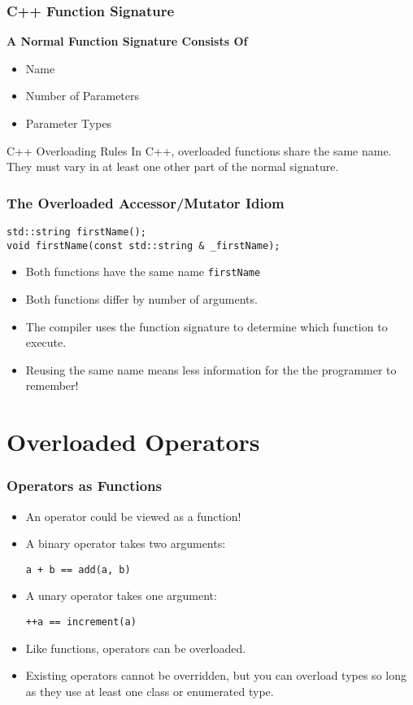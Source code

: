 \documentclass{beamer}
\begin{document}
\begin{frame}
    \frametitle{C++ Function Signature}
    {\bf A Normal Function Signature Consists Of}
    \begin{itemize}
        \item<2-> Name
        \item<3-> Number of Parameters
        \item<4-> Parameter Types
    \end{itemize}
    
    \begin{block}{C++ Overloading Rules}
        In C++, overloaded functions share the same name.  They
        must vary in at least one other part of the normal signature.
    \end{block}
\end{frame}

\begin{frame}[fragile]
    \frametitle{The Overloaded Accessor/Mutator Idiom}
    \begin{verbatim}
std::string firstName();
void firstName(const std::string & _firstName);
    \end{verbatim}
    
    \begin{itemize}[<+->]
        \item Both functions have the same name {\tt firstName}
        \item Both functions differ by number of arguments.
        \item The compiler uses the function signature to determine which
          function to execute.
        \item Reusing the same name means less information for the
          the programmer to remember!
    \end{itemize}
\end{frame}

\section{Overloaded Operators}
\begin{frame}
    \frametitle{Operators as Functions}
    \begin{itemize}[<+->]
        \item An operator could be viewed as a function!
        \item A binary operator takes two arguments:
            \par{\tt a + b == add(a, b)}
        \item A unary operator takes one argument:
            \par{\tt ++a == increment(a)}
        \item Like functions, operators can be overloaded.
        \item Existing operators cannot be overridden, but you can 
            overload types so long as they use at least one class or 
            enumerated type.
    \end{itemize}
\end{frame}
\end{document}
